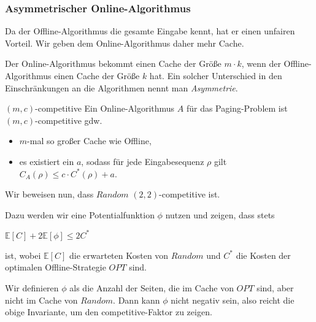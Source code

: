 \documentclass{panikzettel}
\begin{document}
\subsubsection{Asymmetrischer Online-Algorithmus}
\begin{halfboxl}
Da der Offline-Algorithmus die gesamte Eingabe kennt, hat er einen unfairen Vorteil. Wir geben dem Online-Algorithmus daher mehr Cache.

Der Online-Algorithmus bekommt einen Cache der Größe $m \cdot k$, wenn der Offline-Algorithmus einen Cache der Größe $k$ hat. Ein solcher Unterschied in den Einschränkungen an die Algorithmen nennt man \emph{Asymmetrie}.
\end{halfboxl}%
\begin{halfboxr}
\vspace{-\baselineskip}
\begin{defi}{$(m,c)$-competitive}
    Ein Online-Algorithmus $A$ für das Paging-Problem ist $(m,c)$-competitive gdw.
    \begin{itemize}[leftmargin=*]
        \item $m$-mal so großer Cache wie Offline,
        \item es existiert ein $a$, sodass für jede Eingabesequenz $\rho$ gilt $C_A(\rho) \leq c \cdot C^*(\rho)+a$.
    \end{itemize}
\end{defi}
\end{halfboxr}
\vspace{-\baselineskip}

Wir beweisen nun, dass $Random$ $(2,2)$-competitive ist.

Dazu werden wir eine Potentialfunktion $\phi$ nutzen und zeigen, dass stets
\begin{tightcenter}
$\mathbb{E}[C] + 2\mathbb{E}[\phi] \le 2 C^\ast$
\end{tightcenter}
ist, wobei $\mathbb{E}[C]$ die erwarteten Kosten von $Random$ und $C^\ast$ die Kosten der optimalen Offline-Strategie $OPT$ sind.

Wir definieren $\phi$ als die Anzahl der Seiten, die im Cache von $OPT$ sind, aber nicht im Cache von $Random$. Dann kann $\phi$ nicht negativ sein, also reicht die obige Invariante, um den competitive-Faktor zu zeigen.
\end{document}
